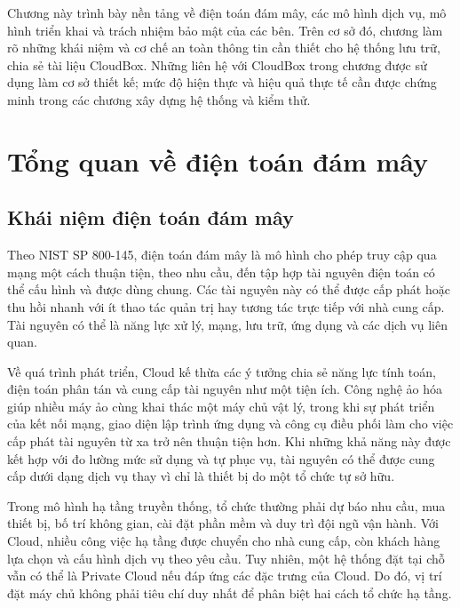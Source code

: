 Chương này trình bày nền tảng về điện toán đám mây, các mô hình dịch vụ, mô hình triển khai và trách nhiệm bảo mật của các bên. Trên cơ sở đó, chương làm rõ những khái niệm và cơ chế an toàn thông tin cần thiết cho hệ thống lưu trữ, chia sẻ tài liệu CloudBox. Những liên hệ với CloudBox trong chương được sử dụng làm cơ sở thiết kế; mức độ hiện thực và hiệu quả thực tế cần được chứng minh trong các chương xây dựng hệ thống và kiểm thử.

\section{Tổng quan về điện toán đám mây}
\subsection{Khái niệm điện toán đám mây}
Theo NIST SP 800-145, điện toán đám mây là mô hình cho phép truy cập qua mạng một cách thuận tiện, theo nhu cầu, đến tập hợp tài nguyên điện toán có thể cấu hình và được dùng chung. Các tài nguyên này có thể được cấp phát hoặc thu hồi nhanh với ít thao tác quản trị hay tương tác trực tiếp với nhà cung cấp. Tài nguyên có thể là năng lực xử lý, mạng, lưu trữ, ứng dụng và các dịch vụ liên quan.\cite{nistcloud}

Về quá trình phát triển, Cloud kế thừa các ý tưởng chia sẻ năng lực tính toán, điện toán phân tán và cung cấp tài nguyên như một tiện ích. Công nghệ ảo hóa giúp nhiều máy ảo cùng khai thác một máy chủ vật lý, trong khi sự phát triển của kết nối mạng, giao diện lập trình ứng dụng và công cụ điều phối làm cho việc cấp phát tài nguyên từ xa trở nên thuận tiện hơn. Khi những khả năng này được kết hợp với đo lường mức sử dụng và tự phục vụ, tài nguyên có thể được cung cấp dưới dạng dịch vụ thay vì chỉ là thiết bị do một tổ chức tự sở hữu.

Trong mô hình hạ tầng truyền thống, tổ chức thường phải dự báo nhu cầu, mua thiết bị, bố trí không gian, cài đặt phần mềm và duy trì đội ngũ vận hành. Với Cloud, nhiều công việc hạ tầng được chuyển cho nhà cung cấp, còn khách hàng lựa chọn và cấu hình dịch vụ theo yêu cầu. Tuy nhiên, một hệ thống đặt tại chỗ vẫn có thể là Private Cloud nếu đáp ứng các đặc trưng của Cloud. Do đó, vị trí đặt máy chủ không phải tiêu chí duy nhất để phân biệt hai cách tổ chức hạ tầng.

